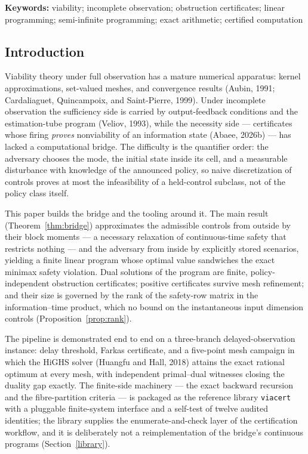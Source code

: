 \documentclass[10pt,twocolumn]{article}
\theoremstyle{plain}
\theoremstyle{definition}
\theoremstyle{remark}
\begin{document}
\textbf{Keywords:} viability; incomplete observation; obstruction
certificates; linear programming; semi-infinite programming; exact
arithmetic; certified computation

\subsection{Introduction}\label{introduction}

Viability theory under full observation has a mature numerical apparatus:
kernel approximations, set-valued meshes, and convergence results
(Aubin, 1991; Cardaliaguet, Quincampoix, and Saint-Pierre, 1999). Under
incomplete observation the sufficiency side is carried by output-feedback
conditions and the estimation-tube program (Veliov, 1993), while the
necessity side --- certificates whose firing \emph{proves} nonviability of an
information state (Abaee, 2026b) --- has lacked a computational bridge. The
difficulty is the quantifier order: the adversary chooses the mode, the
initial state inside its cell, and a measurable disturbance with knowledge of
the announced policy, so naive discretization of controls proves at most the
infeasibility of a held-control subclass, not of the policy class itself.

This paper builds the bridge and the tooling around it. The main result
(Theorem~\ref{thm:bridge}) approximates the admissible controls from outside
by their block moments --- a necessary relaxation of continuous-time safety
that restricts nothing --- and the adversary from inside by explicitly stored
scenarios, yielding a finite linear program whose optimal value sandwiches
the exact minimax safety violation. Dual solutions of the program are finite,
policy-independent obstruction certificates; positive certificates survive
mesh refinement; and their size is governed by the rank of the
safety-row matrix in the information--time product, which no bound on the
instantaneous input dimension controls (Proposition~\ref{prop:rank}).

The pipeline is demonstrated end to end on a three-branch
delayed-observation instance: delay threshold, Farkas certificate, and a
five-point mesh campaign in which the HiGHS solver (Huangfu and Hall, 2018)
attains the exact rational optimum at every mesh, with independent
primal--dual witnesses closing the duality gap exactly. The finite-side
machinery --- the exact backward recursion and the fibre-partition criteria
--- is packaged as the reference library \texttt{viacert} with a pluggable
finite-system interface and a self-test of twelve audited identities; the
library supplies the enumerate-and-check layer of the certification
workflow, and it is deliberately not a reimplementation of the bridge's
continuous programs (Section~\ref{library}).
\end{document}
